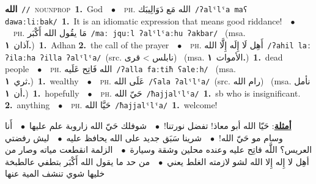 \documentclass[10pt,a4paper,twoside]{article} %
\begin{document}
\begin{multicols}{2}
{\setlength\topsep{0pt}\textbf{\foreignlanguage{arabic}{الله}}\ {\color{gray}\texttt{//}\color{black}}\ \textsc{noun\textunderscore prop}\ \textbf{1.}~God\ \ $\bullet$\ \ \textsc{ph.} \color{gray} \foreignlanguage{arabic}{الله مَع دَوَالِيبَك}\color{black}\ {\color{gray}\texttt{/{\sffamily ʔalˤlˤa maʕ dawaːliːbak}/}\color{black}}\ \textbf{1.}~It is an idiomatic expression that means good riddance!\ \ $\bullet$\ \ \textsc{ph.} \color{gray} \foreignlanguage{arabic}{مَا يقُول الله أَكْبَر}\color{black}\ {\color{gray}\texttt{/{\sffamily maː jquːl ʔalˤlˤaːhu ʔakbar}/}\color{black}}\ \color{gray} (msa. \foreignlanguage{arabic}{آذان}~\foreignlanguage{arabic}{\textbf{١.}})\color{black}\ \textbf{1.}~Adhan  \textbf{2.}~the call of the prayer\ \ $\bullet$\ \ \textsc{ph.} \color{gray} \foreignlanguage{arabic}{أَهِل لَا إِلَه إِلَّا الله}\color{black}\ {\color{gray}\texttt{/{\sffamily ʔahil laː ʔilaːha ʔilla ʔalˤlˤa}/}\color{black}}\ \color{gray}(src. \foreignlanguage{arabic}{نابلس > قرى})\color{black}\ \color{gray} (msa. \foreignlanguage{arabic}{الأموات}~\foreignlanguage{arabic}{\textbf{١.}})\color{black}\ \textbf{1.}~dead people\ \ $\bullet$\ \ \textsc{ph.} \color{gray} \foreignlanguage{arabic}{الله فَاتِح عَلَيه}\color{black}\ {\color{gray}\texttt{/{\sffamily ʔalla faːtiħ ʕaleːh}/}\color{black}}\ \color{gray} (msa. \foreignlanguage{arabic}{ثري}~\foreignlanguage{arabic}{\textbf{١.}})\color{black}\ \textbf{1.}~wealthy\ \ $\bullet$\ \ \textsc{ph.} \color{gray} \foreignlanguage{arabic}{عَلَى الله}\color{black}\ {\color{gray}\texttt{/{\sffamily ʕala ʔalˤlˤa}/}\color{black}}\ \color{gray}(src. \foreignlanguage{arabic}{رام الله})\color{black}\ \color{gray} (msa. \foreignlanguage{arabic}{نأمل أن}~\foreignlanguage{arabic}{\textbf{١.}})\color{black}\ \textbf{1.}~hopefully\ \ $\bullet$\ \ \textsc{ph.} \color{gray} \foreignlanguage{arabic}{حَيّ الله}\color{black}\ {\color{gray}\texttt{/{\sffamily ħajjalˤlˤa}/}\color{black}}\ \textbf{1.}~sb who is insignificant.  \textbf{2.}~anything\ \ $\bullet$\ \ \textsc{ph.} \color{gray} \foreignlanguage{arabic}{حَيَّا الله}\color{black}\ {\color{gray}\texttt{/{\sffamily ħajjalˤlˤa}/}\color{black}}\ \textbf{1.}~welcome!\  \begin{flushright}\color{gray}\foreignlanguage{arabic}{\textbf{\underline{\foreignlanguage{arabic}{أمثلة}}}: حَيّا الله أبو معاذ! تفضل نورتنا!\ $\bullet$\ \  شوفلك حَيّ الله زاروبة علم عليها\ $\bullet$\ \  أَنا وسام مو حَيّ الله!\ $\bullet$\ \  شرينا سَبَق جديد على الله يحافظ عليه\ $\bullet$\ \  ليش رفضتي العريس؟ اللَّه فاتِح عليه وعنده محلين وشقة وسيارة\ $\bullet$\ \  الزلمة انقطعت مياته وصار من أهِل لا إِله إِلا الله لشو لازمته الغلط يعني\ $\bullet$\ \  من حد ما يقول الله أَكْبَر بتطفي عالطبخة خليها شوي تنشف المية عنها}\end{flushright}\color{black}} \vspace{2mm}


\end{multicols}
\end{document}
